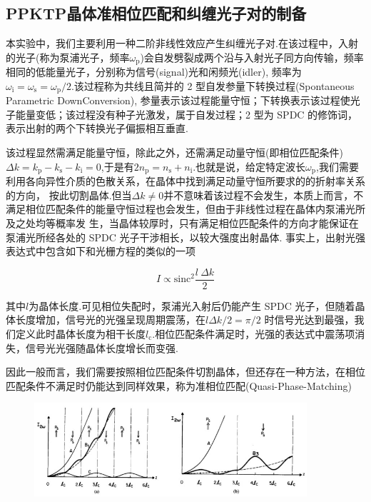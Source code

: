 \documentclass[a4paper,UTF8]{ctexart}
\begin{document}
\subsection{PPKTP晶体准相位匹配和纠缠光子对的制备}

本实验中，我们主要利用一种二阶非线性效应产生纠缠光子对.在该过程中，入射的光子(称为泵浦光子，频率$\omega_\mathrm{p}$)会自发劈裂成两个沿与入射光子同方向传输，频率相同的低能量光子，分别称为信号(signal)光和闲频光(idler), 频率为$\omega_{\mathrm{i}}=\omega_{\mathrm{s}}=\omega_{\mathrm{p}}/2$.该过程称为共线且简并的 2 型自发参量下转换过程(Spontaneous Parametric DownConversion), 参量表示该过程能量守恒；下转换表示该过程使光子能量变低；该过程没有种子光激发，属于自发过程；2 型为 SPDC 的修饰词，表示出射的两个下转换光子偏振相互垂直.

该过程显然需满足能量守恒，除此之外，还需满足动量守恒(即相位匹配条件) $\Delta k=k_{\mathrm{p}}-k_{\mathrm{s}}-k_{\mathrm{i}}=0$,于是有$2n_{\mathrm{p}}=n_{\mathrm{s}}+n_{\mathrm{i}}$.也就是说，给定特定波长$\omega_{\mathrm{p}}$,我们需要利用各向异性介质的色散关系，在晶体中找到满足动量守恒所要求的的折射率关系的方向， 按此切割晶体.但当$\Delta k\neq0$并不意味着该过程不会发生，本质上而言，不满足相位匹配条件的能量守恒过程也会发生，但由于非线性过程在晶体内泵浦光所及之处均等概率发
生，当晶体较厚时，只有满足相位匹配条件的方向才能保证在泵浦光所经各处的 SPDC 光子干涉相长，以较大强度出射晶体. 事实上，出射光强表达式中包含如下和光栅方程的类似的一项

$$
I\propto\text{sinc}^2\frac{l\:\Delta k}2
$$

其中$l$为晶体长度.可见相位失配时，泵浦光入射后仍能产生 SPDC 光子，但随着晶体长度增加，信号光的光强呈现周期震荡，在$l\Delta k/2=\pi/2$ 时信号光达到最强，我们定义此时晶体长度为相干长度$l_\mathrm{c}$.相位匹配条件满足时，光强的表达式中震荡项消失，信号光光强随晶体长度增长而变强.

因此一般而言，我们需要按照相位匹配条件切割晶体，但还存在一种方法，在相位匹配条件不满足时仍能达到同样效果，称为准相位匹配(Quasi-Phase-Matching)


\begin{figure}[H]
    \centering
    \begin{minipage}[b]{0.9\textwidth}
        \centering
        \includegraphics[width=0.9\textwidth]{./fig1.jpg}
    \end{minipage}
\end{figure}
\end{document}
